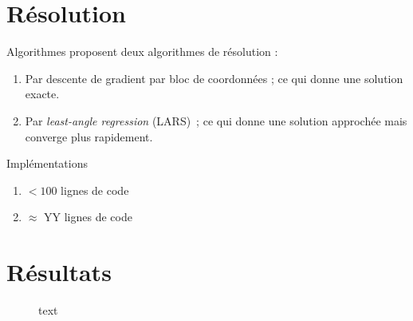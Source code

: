 \documentclass{beamer}
\theoremstyle{definition}
\begin{document}
\section{Résolution}
	\begin{frame}{\insertsection}
		\begin{block}{Algorithmes}
			\citet{gfl} proposent deux algorithmes de résolution :
			\begin{enumerate}
				\item Par descente de gradient par bloc de coordonnées ; ce qui donne une solution exacte.
				\item Par \textit{least-angle regression} (LARS) ; ce qui donne une solution approchée mais converge plus rapidement.
			\end{enumerate}
		\end{block}
	
		\begin{block}{Implémentations}
			\begin{enumerate}
				\item $<100$ lignes de code
				\item $\approx$ YY lignes de code
			\end{enumerate}
		\end{block}
	\end{frame}

\section{Résultats}
	\begin{frame}[allowframebreaks]{\insertsection}
		\begin{figure}
			\caption{text}
			\label{fig:algo1res1}
		\end{figure}
	\end{frame}
\end{document}
